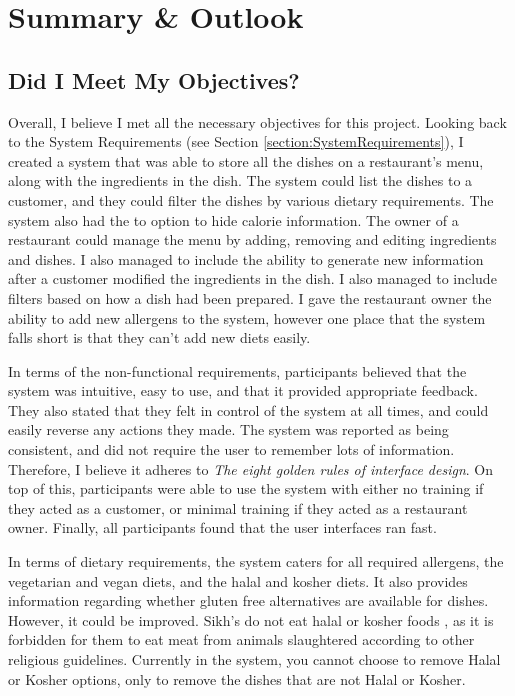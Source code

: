 \chapter{Summary \& Outlook}
\label{section:Evaluation}

\section{Did I Meet My Objectives?}

Overall, I believe I met all the necessary objectives for this project. Looking back to the System Requirements (see Section \ref{section:SystemRequirements}), I created a system that was able to store all the dishes on a restaurant's menu, along with the ingredients in the dish. The system could list the dishes to a customer, and they could filter the dishes by various dietary requirements. The system also had the to option to hide calorie information. The owner of a restaurant could manage the menu by adding, removing and editing ingredients and dishes. I also managed to include the ability to generate new information after a customer modified the ingredients in the dish. I also managed to include filters based on how a dish had been prepared. I gave the restaurant owner the ability to add new allergens to the system, however one place that the system falls short is that they can't add new diets easily.

In terms of the non-functional requirements, participants believed that the system was intuitive, easy to use, and that it provided appropriate feedback. They also stated that they felt in control of the system at all times, and could easily reverse any actions they made. The system was reported as being consistent, and did not require the user to remember lots of information. Therefore, I believe it adheres to \textit{The eight golden rules of interface design}. On top of this, participants were able to use the system with either no training if they acted as a customer, or minimal training if they acted as a restaurant owner. Finally, all participants found that the user interfaces ran fast.

In terms of dietary requirements, the system caters for all required allergens, the vegetarian and vegan diets, and the halal and kosher diets. It also provides information regarding whether gluten free alternatives are available for dishes. However, it could be improved. Sikh's do not eat halal or kosher foods \cite{guidance_on_foods_for_religious_faiths_2009}, as it is forbidden for them to eat meat from animals slaughtered according to other religious guidelines. Currently in the system, you cannot choose to remove Halal or Kosher options, only to remove the dishes that are not Halal or Kosher.

